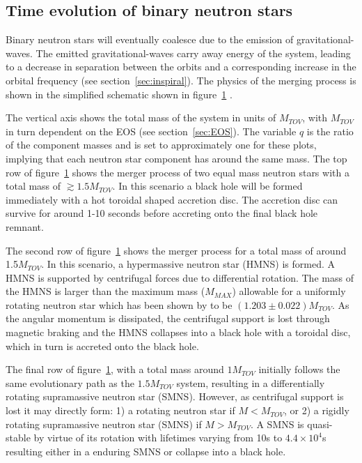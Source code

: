 \subsection{Time evolution of binary neutron stars}
\label{sec:timeEvol}
Binary neutron stars will eventually coalesce due to the emission of gravitational-waves. The emitted gravitational-waves carry away energy of the system, leading to a decrease in separation between the orbits and a corresponding increase in the orbital frequency (see section~\ref{sec:inspiral}). The physics of the merging process is shown in the simplified schematic shown in figure~\ref{fig:BNSMergerPath} \citep{Baiotti2017}.
\begin{figure}[H]
	\begin{center}
		\caption[\protect]{\protect}
		\label{fig:BNSMergerPath}
	\end{center}
\end{figure}
The vertical axis shows the total mass of the system in units of $M_{TOV}$, with $M_{TOV}$ in turn dependent on the EOS (see section~\ref{sec:EOS}). The variable $q$ is the ratio of the component masses and is set to approximately one for these plots, implying that each neutron star component has  around the same mass. The top row of figure~\ref{fig:BNSMergerPath} shows the merger process of two equal mass neutron stars with a total mass of $\gtrsim 1.5 M_{TOV}$. In this scenario a black hole will be formed immediately with a hot toroidal shaped accretion disc. The accretion disc can survive for around 1-10 seconds before accreting onto the final black hole remnant. \par
The second row of figure~\ref{fig:BNSMergerPath} shows the merger process for a total mass of around 1.5$M_{TOV}$. In this scenario, a hypermassive neutron star (HMNS) is formed. A HMNS is supported by centrifugal forces due to differential rotation. The mass of the HMNS is larger than the maximum mass ($M_{MAX}$) allowable for a uniformly rotating neutron star which has been shown by \cite{Breu2016} to be $(1.203 \pm 0.022) M_{TOV}$. As the angular momentum is dissipated, the centrifugal support is lost through magnetic braking and the HMNS collapses into a black hole with a toroidal disc, which in turn is accreted onto the black hole.  \par
The final row of figure~\ref{fig:BNSMergerPath}, with a total mass around $1M_{TOV}$ initially follows the same evolutionary path as the $1.5M_{TOV}$ system, resulting in a differentially rotating supramassive neutron star (SMNS). However, as centrifugal support is lost it may directly form: 1) a rotating neutron star if $M<M_{TOV}$, or 2) a rigidly rotating supramassive neutron star (SMNS) if $M>M_{TOV}$. A SMNS is quasi-stable by virtue of its rotation with lifetimes varying from 10s to $4.4\times 10^4$s \citep{Ravi2014} resulting either in a enduring SMNS or collapse into a black hole. 

